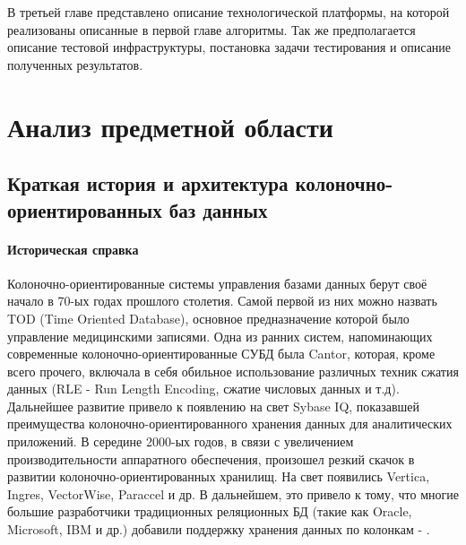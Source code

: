 \documentclass{matmex-diploma}
\begin{document}
    В третьей главе представлено описание технологической платформы, на которой реализованы описанные в первой главе алгоритмы. Так же предполагается описание тестовой инфраструктуры, постановка задачи тестирования и описание полученных результатов.
    
\section{Анализ предметной области}
    \subsection{Краткая история и архитектура колоночно-ориентированных баз данных}
        \paragraph{Историческая справка}
            Колоночно-ориентированные системы управления базами данных берут своё начало в 70-ых годах прошлого столетия. Самой первой из них можно назвать TOD (Time Oriented Database), основное предназначение которой было управление медицинскими записями. Одна из ранних систем, напоминающих современные колоночно-ориентированные СУБД была Cantor, которая, кроме всего прочего, включала в себя обильное использование различных техник сжатия данных (RLE - Run Length Encoding, сжатие числовых данных и т.д). Дальнейшее развитие привело к появлению на свет Sybase IQ, показавшей преимущества колоночно-ориентированного хранения данных для аналитических приложений. В середине 2000-ых годов, в связи с увеличением производительности аппаратного обеспечения, произошел резкий скачок в развитии колоночно-ориентированных хранилищ. На свет появились Vertica, Ingres, VectorWise, Paraccel и др. В дальнейшем, это привело к тому, что многие большие разработчики традиционных реляционных БД (такие как Oracle, Microsoft, IBM и др.) добавили поддержку хранения данных по колонкам - \cite{abadidesign}.
\end{document}
